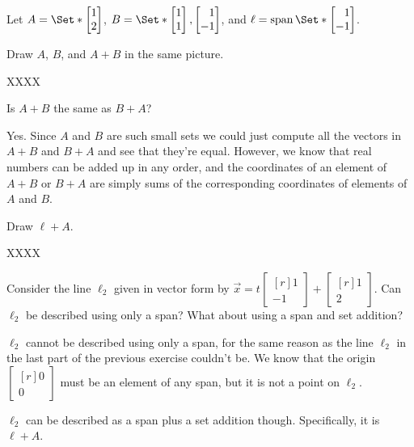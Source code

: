 \documentclass{problemset}
\DeclareMathOperator{\Span}{span}
\newcommand{\mat}[1]{\begin{bmatrix*}[r]#1\end{bmatrix*}}
\begin{document}
	\question
	Let $A=\Set*{\mat{1\\2}}$, $B=\Set*{\mat{1\\1},\mat{1\\-1}}$, 
	and $\ell=\Span\Set*{\mat{1\\-1}}$.
	\begin{parts}
		\item Draw $A$, $B$, and $A+B$ in the same picture.
			\begin{solution}
				XXXX
			\end{solution}
		\item Is $A+B$ the same as $B+A$?
			\begin{solution}
				Yes. Since $A$ and $B$ are such small sets we could just
				compute all the vectors in $A+B$ and $B+A$ and see that they're 
				equal. However, we know that real numbers can be added up in any 
				order, and the coordinates of an element of $A+B$ or $B+A$ are 
				simply sums of the corresponding coordinates of elements of $A$ and $B$. 
			\end{solution}
		\item Draw $\ell+A$.
			\begin{solution}
				XXXX
			\end{solution}
		\item Consider the line $\ell_2$ given in vector form by $\vec x=t\mat{1\\-1}+\mat{1\\2}$.
			Can $\ell_2$ be described using only a span? What about using a span
			and set addition?
			\begin{solution}
				$\ell_2$ cannot be described using only a span, for the same reason 
				as the line $\ell_2$ in the last part of the previous exercise
				couldn't be. We know that the origin $\mat{0\\0}$ must be an element
				of any span, but it is not a point on $\ell_2$. 

				$\ell_2$ can be described as a span plus a set addition though. 
				Specifically, it is $\ell + A$. 
			\end{solution}
	\end{parts}
\end{document}
